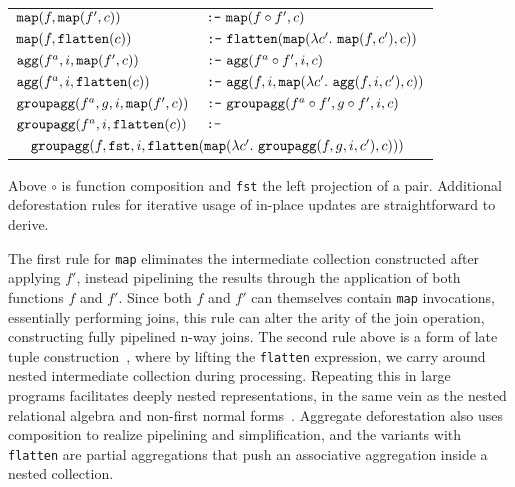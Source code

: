 \vspace{1mm}\hspace{-6mm}
\begin{tabular}{p{3.6cm}l}
$\mbox{\texttt{map}}(f, \mbox{\texttt{map}}(f', c))$ 
    & $\mbox{\texttt{:-}}\ \mbox{\texttt{map}}(f \circ f', c)$
\\
$\mbox{\texttt{map}}(f, \mbox{\texttt{flatten}}(c))$
    & $\xform\ \flatten(\map(\lambda c'.\ \map(f,c'), c))$
\\
$\mbox{\texttt{agg}}(f^a, i, \mbox{\texttt{map}}(f', c))$
    & $\xform\ \agg(f^a \circ f', i, c)$
\\
$\mbox{\texttt{agg}}(f^a, i, \mbox{\texttt{flatten}}(c))$
    & $\mbox{\texttt{:-}}\ \mbox{\texttt{agg}}(f, i, \mbox{\texttt{map}}(\lambda c'.\ \mbox{\texttt{agg}}(f, i, c'),c))$
\\
$\mbox{\texttt{groupagg}}(f^a, g, i, \mbox{\texttt{map}}(f', c))$
    & $\xform\ \groupagg(f^a \circ f', g \circ f', i, c)$
\\
$\mbox{\texttt{groupagg}}(f^a, i, \mbox{\texttt{flatten}}(c))$ & $\mbox{\texttt{:-}}$
\\
\multicolumn{2}{l}{
$\quad\mbox{\texttt{groupagg}}(f, \mbox{\texttt{fst}}, i, \mbox{\texttt{flatten}}(
    \mbox{\texttt{map}}(\lambda c'.\ \mbox{\texttt{groupagg}}(f, g, i, c'),c)))$}
\end{tabular}


\vspace{1mm}
Above $\circ$ is function composition and \texttt{fst} the left projection of a
pair.
Additional deforestation rules for iterative usage of in-place updates are
straightforward to derive.

The first rule for \texttt{map} eliminates the intermediate collection
constructed after applying $f'$, instead pipelining the results through the
application of both functions $f$ and $f'$. Since both $f$ and $f'$ can
themselves contain \texttt{map} invocations, essentially performing joins, this
rule can alter the arity of the join operation, constructing fully pipelined
n-way joins. The second rule above is a form of late tuple
construction~\cite{abadi-icde:07}, where by lifting the \texttt{flatten}
expression, we carry around nested intermediate collection during processing.
Repeating this in large programs facilitates deeply nested representations, in
the same vein as the nested relational algebra and non-first normal
forms~\cite{schek-infsys:86}. Aggregate deforestation also uses composition to
realize pipelining and simplification, and the variants with \texttt{flatten}
are partial aggregations that push an associative aggregation inside
a nested collection.


